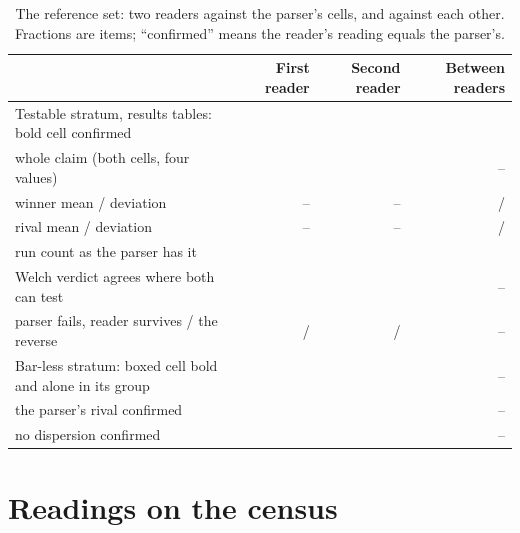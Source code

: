 \documentclass[preprint,review,12pt]{elsarticle}
\begin{document}
\begin{table}[t]
\caption{The reference set: two readers against the parser's cells, and against each other. Fractions are items; ``confirmed'' means the reader's reading equals the parser's.}
\label{tab:refset}
\centering
\footnotesize
\begin{tabular}{@{}lrrr@{}}
\toprule
 & First reader & Second reader & Between readers \\
\midrule
Testable stratum, results tables: bold cell confirmed & \nGBoldCellFrac{} & \nGTwoBoldCellFrac{} & \nAgBoldOkFrac{} \\
\quad whole claim (both cells, four values) & \nGClaimFrac{} & \nGTwoClaimFrac{} & -- \\
\quad winner mean / deviation & -- & -- & \nAgWinnerMeanFrac{} / \nAgWinnerDispFrac{} \\
\quad rival mean / deviation & -- & -- & \nAgRunnerMeanFrac{} / \nAgRunnerDispFrac{} \\
\quad run count as the parser has it & \nGNRunsFrac{} & \nGTwoNRunsFrac{} & \nAgNRunsFrac{} \\
\quad Welch verdict agrees where both can test & \nGVerdictFrac{} & \nGTwoVerdictFrac{} & -- \\
\quad \quad parser fails, reader survives / the reverse & \nGPipeFailOnly{} / \nGReaderFailOnly{} & \nGTwoPipeFailOnly{} / \nGTwoReaderFailOnly{} & -- \\
Bar-less stratum: boxed cell bold and alone in its group & \nGNoBarBoldFrac{} & \nGTwoNoBarBoldFrac{} & -- \\
\quad the parser's rival confirmed & \nGNoBarRunnerFrac{} & \nGTwoNoBarRunnerFrac{} & -- \\
\quad no dispersion confirmed & \nGNoBarAbsentFrac{} & \nGTwoNoBarAbsentFrac{} & -- \\
\bottomrule
\end{tabular}
\end{table}

\section{Readings on the census}
\label{app:readings}
\end{document}
